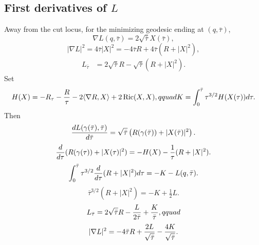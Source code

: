 \subsection{First derivatives of $L$}
Away from the cut locus, for the minimizing geodesic ending at $(q,\bar\tau)$,
\begin{equation}\label{grad1}\nabla L(q,\bar\tau)=2\sqrt{\bar\tau}X(\bar\tau),\end{equation}
\begin{equation}\label{gradsq}|\nabla L|^2=4\bar\tau|X|^2=-4\bar\tau R+4\bar\tau(R+|X|^2),\end{equation}
\begin{align}\label{timed}
L_{\bar\tau}&=2\sqrt{\bar\tau}R-\sqrt{\bar\tau}(R+|X|^2).
\end{align}
Set
\begin{equation}\label{Hexp}H(X)=-R_\tau-{R\over\tau}-2\langle\nabla R,X\rangle+2\operatorname{Ric}(X,X),qquad
K=\int_0^{\bar\tau}\tau^{3/2}H(X(\tau))d\tau.
\end{equation}
Then
\begin{equation}\label{grad2}
{dL(\gamma(\bar\tau),\bar\tau)\over d\bar\tau}
=\sqrt{\bar\tau}\left(R(\gamma(\bar\tau))+|X(\bar\tau)|^2\right).
\end{equation}
\begin{equation}\label{ddt}
{d\over d\tau}(R(\gamma(\tau))+|X(\tau)|^2)
=-H(X)-{1\over\tau}(R+|X|^2).
\end{equation}
\begin{equation}\label{parts}
\int_0^{\bar\tau}\tau^{3/2}{d\over d\tau}(R+|X|^2)d\tau=-K-L(q,\bar\tau).
\end{equation}
\begin{equation}\label{sub4}\bar\tau^{3/2}(R+|X|^2)=-K+\tfrac12L.\end{equation}
\begin{equation}\label{touse1}L_{\bar\tau}=2\sqrt{\bar\tau}R-{L\over2\bar\tau}+{K\over\bar\tau},qquad
\end{equation}
\begin{equation}\label{ttouse1}
|\nabla L|^2=-4\bar\tau R+{2L\over\sqrt{\bar\tau}}-{4K\over\sqrt{\bar\tau}}.
\end{equation}


